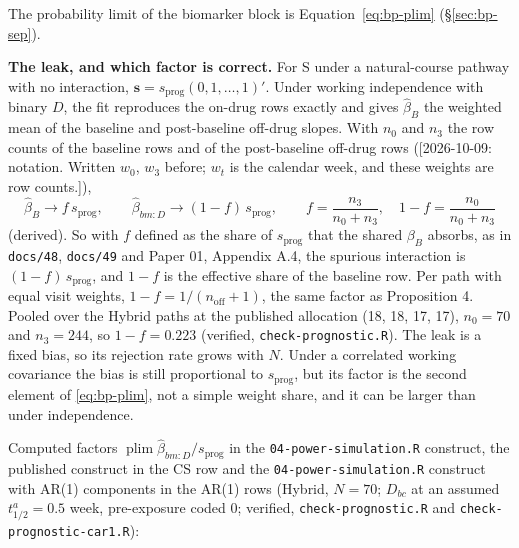 \documentclass[11pt]{article}
\newcommand{\note}[1]{\textcolor{blue!60!black}{\small [#1]}}
\newcommand{\code}[1]{\texttt{#1}}
\begin{document}
The probability limit of the biomarker block is
Equation~\eqref{eq:bp-plim} (\S\ref{sec:bp-sep}).

\textbf{The leak, and which factor is correct.} For S under a
natural-course pathway with no interaction,
$\mathbf s = s_{\text{prog}}(0, 1, \dots, 1)'$. Under working
independence with binary $D$, the fit reproduces the on-drug rows
exactly and gives $\hat\beta_B$ the weighted mean of the baseline and
post-baseline off-drug slopes. With $n_0$ and $n_3$ the row counts
of the baseline rows and of the post-baseline off-drug rows
(\note{2026-10-09: notation. Written $w_0$, $w_3$ before; $w_t$ is the
calendar week, and these weights are row counts.}),
\begin{equation}
\hat\beta_B \to f\,s_{\text{prog}}, \qquad
\hat\beta_{bm:D} \to (1 - f)\,s_{\text{prog}}, \qquad
f = \frac{n_3}{n_0 + n_3}, \quad 1 - f = \frac{n_0}{n_0 + n_3}
\label{eq:bp-leak}
\end{equation}
(derived). So with $f$ defined as the share of $s_{\text{prog}}$ that
the shared $\beta_B$ absorbs, as in \code{docs/48}, \code{docs/49} and
Paper 01, Appendix A.4, the spurious interaction is
$(1 - f)\,s_{\text{prog}}$, and $1 - f$ is the effective share of the
baseline row. Per path with equal visit weights,
$1 - f = 1/(n_{\text{off}} + 1)$, the same factor as Proposition 4.
Pooled over the Hybrid paths at the published allocation (18, 18, 17,
17), $n_0 = 70$ and $n_3 = 244$, so $1 - f = 0.223$ (verified,
\code{check-prognostic.R}). The leak is a fixed bias, so its rejection
rate grows with $N$. Under a correlated working covariance the bias is
still proportional to $s_{\text{prog}}$, but its factor is the second
element of \eqref{eq:bp-plim}, not a simple weight share, and it can
be larger than under independence.

Computed factors $\operatorname{plim}\hat\beta_{bm:D}/s_{\text{prog}}$
in the \code{04-power-simulation.R} construct, the published construct
in the CS row and the \code{04-power-simulation.R} construct with AR(1)
components in the AR(1) rows (Hybrid, $N = 70$; $D_{bc}$ at an assumed
$t_{1/2}^a = 0.5$ week, pre-exposure coded 0; verified,
\code{check-prognostic.R} and \code{check-prognostic-car1.R}):
\end{document}
